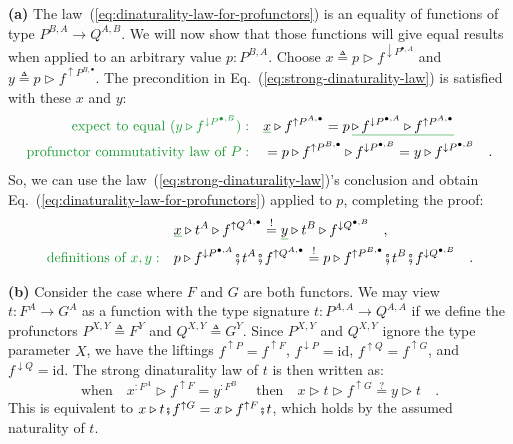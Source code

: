 \textbf{(a)} The law~(\ref{eq:dinaturality-law-for-profunctors})
is an equality of functions of type $P^{B,A}\rightarrow Q^{A,B}$.
We will now show that those functions will give equal results when
applied to an arbitrary value $p:P^{B,A}$. Choose $x\triangleq p\triangleright f^{\downarrow P^{\bullet,A}}$
and $y\triangleq p\triangleright f^{\uparrow P^{B,\bullet}}$. The
precondition in Eq.~(\ref{eq:strong-dinaturality-law}) is satisfied
with these $x$ and $y$:
\begin{align*}
{\color{greenunder}\text{expect to equal }(y\triangleright f^{\downarrow P^{\bullet,B}}):}\quad & \gunderline x\triangleright f^{\uparrow P^{A,\bullet}}=p\,\gunderline{\triangleright\,f^{\downarrow P^{\bullet,A}}\triangleright f^{\uparrow P^{A,\bullet}}}\\
{\color{greenunder}\text{profunctor commutativity law of }P:}\quad & =p\triangleright f^{\uparrow P^{B,\bullet}}\triangleright f^{\downarrow P^{\bullet,B}}=y\triangleright f^{\downarrow P^{\bullet,B}}\quad.
\end{align*}
So, we can use the law~(\ref{eq:strong-dinaturality-law})\textsf{'}s conclusion
and obtain Eq.~(\ref{eq:dinaturality-law-for-profunctors}) applied
to $p$, completing the proof:
\begin{align*}
 & \gunderline x\triangleright t^{A}\triangleright f^{\uparrow Q^{A,\bullet}}\overset{!}{=}\gunderline y\triangleright t^{B}\triangleright f^{\downarrow Q^{\bullet,B}}\quad,\\
{\color{greenunder}\text{definitions of }x,y:}\quad & p\triangleright f^{\downarrow P^{\bullet,A}}\bef t^{A}\bef f^{\uparrow Q^{A,\bullet}}\overset{!}{=}p\triangleright f^{\uparrow P^{B,\bullet}}\bef t^{B}\bef f^{\downarrow Q^{\bullet,B}}\quad.
\end{align*}

\textbf{(b)} Consider the case where $F$ and $G$ are both functors.
We may view $t:F^{A}\rightarrow G^{A}$ as a function with the type
signature $t:P^{A,A}\rightarrow Q^{A,A}$ if we define the profunctors
$P^{X,Y}\triangleq F^{Y}$ and $Q^{X,Y}\triangleq G^{Y}$. Since $P^{X,Y}$
and $Q^{X,Y}$ ignore the type parameter $X$, we have the liftings
$f^{\uparrow P}=f^{\uparrow F}$, $f^{\downarrow P}=\text{id}$, $f^{\uparrow Q}=f^{\uparrow G}$,
and $f^{\downarrow Q}=\text{id}$. The strong dinaturality law of
$t$ is then written as:
\[
\text{when}\quad x^{:F^{A}}\triangleright f^{\uparrow F}=y^{:F^{B}}\quad\text{ then}\quad x\triangleright t\triangleright f^{\uparrow G}\overset{?}{=}y\triangleright t\quad.
\]
This is equivalent to $x\triangleright t\bef f^{\uparrow G}=x\triangleright f^{\uparrow F}\bef t$,
which holds by the assumed naturality of $t$.

